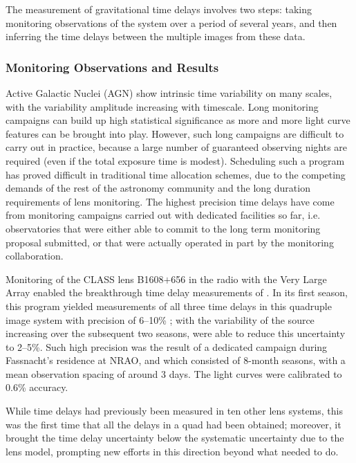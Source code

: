 The measurement of gravitational time delays involves two steps:  taking
monitoring observations of the system over a period of several years,
and then inferring the time delays between the multiple images from
these data.


\subsubsection{Monitoring Observations and Results}

Active Galactic Nuclei (AGN) show intrinsic time variability on many
scales, with the variability amplitude increasing with timescale. Long
monitoring campaigns can build up high statistical significance as
more and more light curve features can be brought into play.  However,
such long campaigns are difficult to carry out in practice, because a
large number of guaranteed observing nights are required (even if the
total exposure time is modest). Scheduling such a program has proved
difficult in traditional time allocation schemes, due to the competing
demands of the rest of the astronomy community and the long duration
requirements of lens monitoring. The highest precision time delays
have come from monitoring campaigns carried out with dedicated
facilities so far, i.e. observatories that were either able to commit
to the long term monitoring proposal submitted, or that were actually
operated in part by the monitoring collaboration.


Monitoring of the CLASS lens B1608$+$656 in the radio with the Very
Large Array enabled the breakthrough  time delay measurements of
\citep{Fas++02}. In its first season, this program  yielded measurements
of all three time delays in this quadruple image system with  precision
of 6--10\% \citep{Fas++99}; with the variability of the source
increasing over the subsequent two seasons, \citep{Fas++02} were able to
reduce this uncertainty to 2--5\%. Such high precision was the result of
a dedicated campaign during Fassnacht's residence at NRAO, and which
consisted of 8-month seasons, with a mean observation spacing of around
3 days. The light curves were calibrated to 0.6\% accuracy.

While time delays had previously been measured in ten other lens
systems, this was the first time that all the delays in a quad had
been obtained; moreover, it brought the time delay uncertainty below
the systematic uncertainty due to the lens model, prompting new
efforts in this direction beyond what \citet{K+F99} needed to do.


